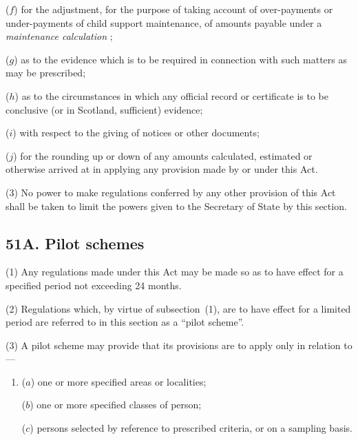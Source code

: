 \documentclass[12pt,a4paper]{article}
\begin{document}
\begin{enumerate}
($f$) for the adjustment, for the purpose of taking account of over-payments or under-payments of child support maintenance, of amounts payable under a 
\emph{maintenance calculation}%
;

($g$) as to the evidence which is to be required in connection with such matters as may be prescribed;

($h$) as to the circumstances in which any official record or certificate is to be conclusive (or in Scotland, sufficient) evidence;

($i$) with respect to the giving of notices or other documents;

($j$) for the rounding up or down of any amounts calculated, estimated or otherwise arrived at in applying any provision made by or under this Act.
\end{enumerate}

(3) No power to make regulations conferred by any other provision of this Act shall be taken to limit the powers given to the Secretary of State by this section.


\subsection{51A. Pilot schemes}

(1) Any regulations made under this Act may be made so as to have effect for a specified period not exceeding 24 months.

(2)
Regulations which, by virtue of subsection~(1), are to have effect for a limited period are referred to in this section as a “pilot scheme”.

(3) A pilot scheme may provide that its provisions are to apply only in relation to---
\begin{enumerate}\item[]
($a$) one or more specified areas or localities;

($b$) one or more specified classes of person;

($c$) persons selected by reference to prescribed criteria, or on a sampling basis.
\end{enumerate}
\end{document}
